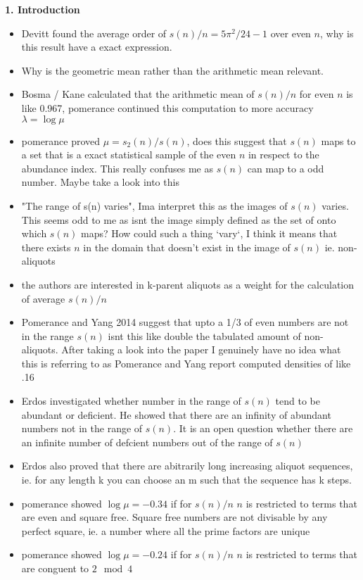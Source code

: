 \textbf{1. Introduction}
                \begin{itemize}
    \item Devitt found the average order of $s(n)/n = 5\pi^2/24 - 1$ over even $n$, why is this result have a exact expression.
    \item Why is the geometric mean rather than the arithmetic mean relevant.
    \item Bosma / Kane calculated that the arithmetic mean of $s(n) / n$ for even $n$ is like 0.967, pomerance continued this computation to more accuracy $\lambda = \log \mu$
    \item pomerance proved $\mu = s_2(n) / s(n)$, does this suggest that $s(n)$ maps to a set that is a exact statistical sample of the even $n$ in respect to the abundance index. This really confuses me as $s(n)$ can map to a odd number. Maybe take a look into this
    \item "The range of s(n) varies", Ima interpret this as the images of $s(n)$ varies. This seems odd to me as isnt the image simply defined as the set of onto which $s(n)$ maps? How could such a thing `vary`, I think it means that there exists $n$ in the domain that doesn't exist in the image of $s(n)$ ie. non-aliquots
    \item the authors are interested in k-parent aliquots as a weight for the calculation of average $s(n) / n$
    \item Pomerance and Yang 2014 suggest that upto a 1/3 of even numbers are not in the range $s(n)$ isnt this like double the tabulated amount of non-aliquots. After taking a look into the paper I genuinely have no idea what this is referring to as Pomerance and Yang report computed densities of like .16
    \item Erdos investigated whether number in the range of $s(n)$ tend to be abundant or deficient. He showed that there are an infinity of abundant numbers not in the range of $s(n)$. It is an open question whether there are an infinite number of defcient numbers out of the range of $s(n)$
    \item Erdos also proved that there are abitrarily long increasing aliquot sequences, ie. for any length k you can choose an m such that the sequence has k steps.
    \item pomerance showed $\log \mu = -0.34$ if for $s(n)/n$ $n$ is restricted to terms that are even and square free. Square free numbers are not divisable by any perfect square, ie. a number where all the prime factors are unique
    \item pomerance showed $\log \mu = -0.24$ if for $s(n)/n$ $n$ is restricted to terms that are conguent to $2 \mod 4$ 

\end{itemize}
